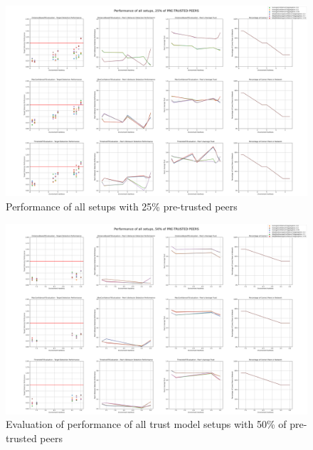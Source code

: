 \begin{figure}
    \centering
    \includegraphics[width=0.9\paperwidth, angle=90]{assets/25_all_metrics.png}
    \caption{Performance of all setups with 25\% pre-trusted peers}
    \label{fig:performance-all-setups-25-pretrusted}
\end{figure}

\begin{figure}
    \centering
    \includegraphics[width=0.9\paperwidth, angle=90]{assets/50_all_metrics.png}
    \caption{Evaluation of performance of all trust model setups with 50\% of pre-trusted peers}
    \label{fig:performance-all-setups-50-pretrusted}
\end{figure}

